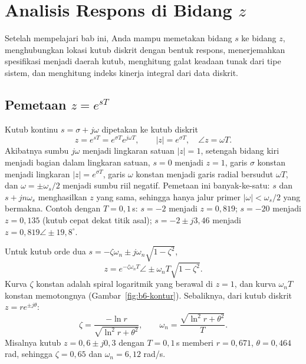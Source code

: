 \chapter{Analisis Respons di Bidang $z$}
\label{bab:responsz}

\begin{tujuan}
	Setelah mempelajari bab ini, Anda mampu memetakan bidang $s$ ke bidang $z$, menghubungkan lokasi kutub diskrit dengan bentuk respons, menerjemahkan spesifikasi menjadi daerah kutub, menghitung galat keadaan tunak dari tipe sistem, dan menghitung indeks kinerja integral dari data diskrit.
\end{tujuan}

\section{Pemetaan $z = e^{sT}$}
Kutub kontinu $s = \sigma + j\omega$ dipetakan ke kutub diskrit
\begin{equation}
	z = e^{sT} = e^{\sigma T}e^{j\omega T},\qquad |z| = e^{\sigma T},\quad \angle z = \omega T.
\end{equation}
Akibatnya sumbu $j\omega$ menjadi lingkaran satuan $|z| = 1$, setengah bidang kiri menjadi bagian dalam lingkaran satuan, $s = 0$ menjadi $z = 1$, garis $\sigma$ konstan menjadi lingkaran $|z| = e^{\sigma T}$, garis $\omega$ konstan menjadi garis radial bersudut $\omega T$, dan $\omega = \pm\omega_s/2$ menjadi sumbu riil negatif. Pemetaan ini banyak-ke-satu: $s$ dan $s + jn\omega_s$ menghasilkan $z$ yang sama, sehingga hanya jalur primer $|\omega| < \omega_s/2$ yang bermakna. Contoh dengan $T = 0{,}1$\,s: $s = -2$ menjadi $z = 0{,}819$; $s = -20$ menjadi $z = 0{,}135$ (kutub cepat dekat titik asal); $s = -2 \pm j3{,}46$ menjadi $z = 0{,}819\angle\pm19{,}8^\circ$.

Untuk kutub orde dua $s = -\zeta\omega_n \pm j\omega_n\sqrt{1-\zeta^2}$,
\begin{equation}
	z = e^{-\zeta\omega_nT}\angle\pm\omega_nT\sqrt{1-\zeta^2}.
\end{equation}
Kurva $\zeta$ konstan adalah spiral logaritmik yang berawal di $z = 1$, dan kurva $\omega_nT$ konstan memotongnya (Gambar~\ref{fig:b6-kontur}). Sebaliknya, dari kutub diskrit $z = re^{\pm j\theta}$:
\begin{equation}
	\zeta = \frac{-\ln r}{\sqrt{\ln^2r + \theta^2}},\qquad \omega_n = \frac{\sqrt{\ln^2r + \theta^2}}{T}.
	\label{eq:b6-inv}
\end{equation}
Misalnya kutub $z = 0{,}6 \pm j0{,}3$ dengan $T = 0{,}1$\,s memberi $r = 0{,}671$, $\theta = 0{,}464$ rad, sehingga $\zeta = 0{,}65$ dan $\omega_n = 6{,}12$ rad/s.

